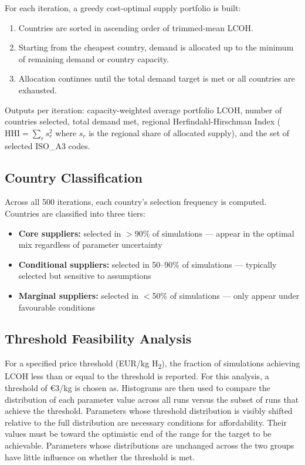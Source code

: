 For each iteration, a greedy cost-optimal supply portfolio is built:
\begin{enumerate}
    \item Countries are sorted in ascending order of trimmed-mean LCOH.
    \item Starting from the cheapest country, 
    demand is allocated up to the minimum of remaining demand or country capacity.
    \item Allocation continues until the total demand target is met or all countries are exhausted.
\end{enumerate}

Outputs per iteration: capacity-weighted average portfolio LCOH, number of countries selected, total demand met, regional Herfindahl-Hirschman Index ($\text{HHI} = \sum_r s_r^2$ where $s_r$ is the regional share of allocated supply), and the set of selected ISO\_A3 codes.

\subsection{Country Classification}

Across all 500 iterations, each country's selection frequency is computed. Countries are classified into three tiers:
\begin{itemize}
    \item \textbf{Core suppliers:} selected in $>$90\% of simulations --- appear in the optimal mix regardless of parameter uncertainty
    \item \textbf{Conditional suppliers:} selected in 50--90\% of simulations --- typically selected but sensitive to assumptions
    \item \textbf{Marginal suppliers:} selected in $<$50\% of simulations --- only appear under favourable conditions
\end{itemize}

\subsection{Threshold Feasibility Analysis}

For a specified price threshold (EUR/kg H\textsubscript{2}), the fraction of simulations achieving LCOH less than or equal to the threshold is reported. For this analysis, a threshold of €3/kg is chosen as. Histograms are then used to compare the distribution of each parameter value across all runs versus the subset of runs that achieve the threshold. Parameters whose threshold distribution is visibly shifted relative to the full distribution are necessary conditions for affordability. Their values must be toward the optimistic end of the range for the target to be achievable. Parameters whose distributions are unchanged across the two groups have little influence on whether the threshold is met.


